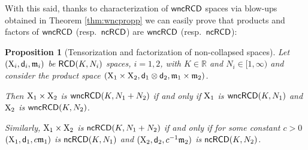 \documentclass[reqno,11pt]{article}
\numberwithin{equation}{section}
\newcommand{\R}{\mathbb{R}}
\newcommand{\mm}{{\mbox{\boldmath$m$}}}
\newcommand{\sfd}{{\sf d}}
\renewcommand{\mm}{\mathfrak m}                                %
\newtheorem{proposition}[theorem]{Proposition}
\newcommand{\X}{{\rm X}}
\newcommand{\RCD}{{\sf RCD}}
\newcommand{\ncRCD}{{\sf ncRCD}}
\newcommand{\wncRCD}{{\sf wncRCD}}
\begin{document}
With this said, thanks to characterization of $\wncRCD$ spaces via blow-ups obtained in Theorem \ref{thm:wncpropp} we can easily prove that products and factors of $\wncRCD$ (resp.\ $\ncRCD$) are $\wncRCD$ (resp.\ $\ncRCD$):
\begin{proposition}[Tensorization and factorization of non-collapsed spaces]\label{prop:prod}
Let $(\X_i,\sfd_i,\mm_i)$ be $\RCD(K,N_i)$ spaces, $i=1,2$, with $K\in\R$ and $N_i\in[1,\infty)$ and consider the product space $(\X_1\times\X_2,\sfd_1\otimes\sfd_2,\mm_1\times\mm_2)$.

Then $\X_1\times\X_2$ is $\wncRCD(K,N_1+N_2)$ if and only if $\X_1$ is $\wncRCD(K,N_1)$ and $\X_2$ is $\wncRCD(K,N_2)$.

Similarly, $\X_1\times\X_2$ is $\ncRCD(K,N_1+N_2)$ if and only if for some constant $c>0$ $(\X_1,\sfd_1,c\mm_1)$ is $\ncRCD(K,N_1)$ and $(\X_2,\sfd_2,c^{-1}\mm_2)$ is $\ncRCD(K,N_2)$.
\end{proposition}
\end{document}
